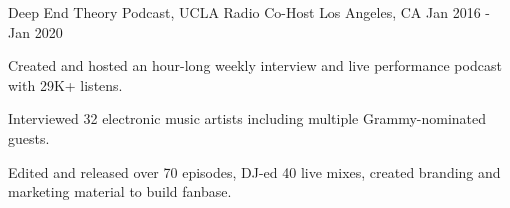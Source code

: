 


\begin{cventries}

\cventry
{Deep End Theory Podcast, UCLA Radio}
{Co-Host}
{Los Angeles, CA}
{Jan 2016 - Jan 2020}
{
\begin{cvitems}
\item Created and hosted an hour-long weekly interview and live performance podcast with 29K+ listens.
\item Interviewed 32 electronic music artists including multiple Grammy-nominated guests.
\item Edited and released over 70 episodes, DJ-ed 40 live mixes, created branding and marketing material to build fanbase.
\end{cvitems}
}

\end{cventries}